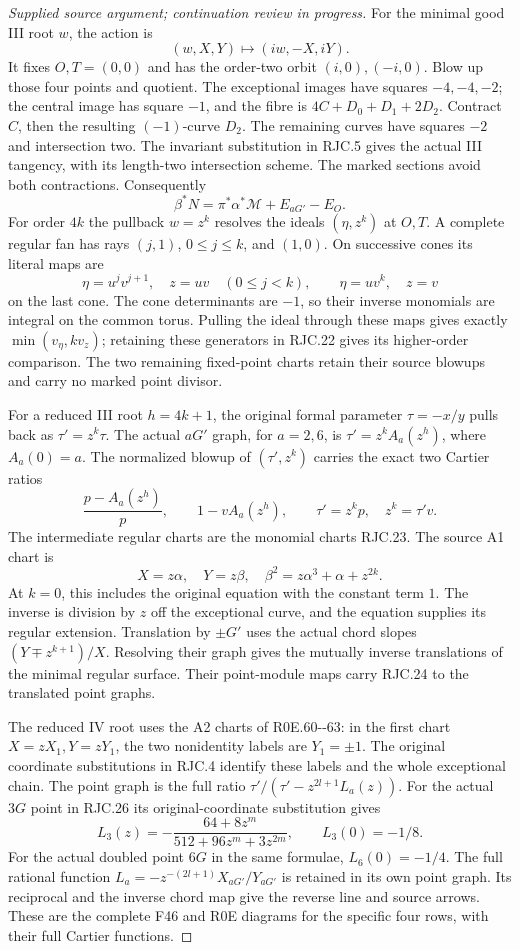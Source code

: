 \begin{proof}[Supplied source argument; continuation review in progress]
For the minimal good III root \(w\), the action is
\[
 (w,X,Y)\longmapsto(iw,-X,iY).
 \tag{RJC.21}
\]
It fixes \(O,T=(0,0)\) and has the order-two orbit
\((i,0),(-i,0)\). Blow up those four points and quotient. The
exceptional images have squares \(-4,-4,-2\); the central image
has square \(-1\), and the fibre is \(4C+D_0+D_1+2D_2\).
Contract \(C\), then the resulting \((-1)\)-curve \(D_2\).
The remaining curves have squares \(-2\) and intersection two.
The invariant substitution in RJC.5 gives the actual III
tangency, with its length-two intersection scheme. The marked
sections avoid both contractions. Consequently
\[
 \beta^*N=\pi^*\alpha^*\mathcal M+E_{aG'}-E_O.
 \tag{RJC.22}
\]
For order \(4k\) the pullback \(w=z^k\) resolves the ideals
\((\eta,z^k)\) at \(O,T\). A complete regular fan has rays
\((j,1)\), \(0\le j\le k\), and \((1,0)\). On successive cones its
literal maps are
\[
 \eta=u^jv^{j+1},\quad z=uv\quad(0\le j<k),\qquad
 \eta=uv^k,\quad z=v
 \tag{RJC.23}
\]
on the last cone. The cone determinants are \(-1\), so their inverse
monomials are integral on the common torus. Pulling the ideal through
these maps gives exactly \(\min(v_\eta,k v_z)\); retaining these
generators in RJC.22 gives its higher-order comparison. The two
remaining fixed-point charts retain their source blowups and carry
no marked point divisor.

For a reduced III root \(h=4k+1\), the original formal parameter
\(\tau=-x/y\) pulls back as \(\tau'=z^k\tau\). The actual
\(aG'\) graph, for \(a=2,6\), is
\(\tau'=z^k A_a(z^h)\), where \(A_a(0)=a\).
The normalized blowup of \((\tau',z^k)\) carries the exact two
Cartier ratios
\[
 \frac{p-A_a(z^h)}p,\qquad 1-vA_a(z^h),\qquad
 \tau'=z^kp,\quad z^k=\tau'v.
 \tag{RJC.24}
\]
The intermediate regular charts are the monomial charts RJC.23.
The source A1 chart is
\[
 X=z\alpha,\quad Y=z\beta,\quad
 \beta^2=z\alpha^3+\alpha+z^{2k}.
 \tag{RJC.25}
\]
At \(k=0\), this includes the original equation with the constant
term \(1\). The inverse is division by \(z\) off the exceptional
curve, and the equation supplies its regular extension. Translation
by \(\pm G'\) uses the actual chord slopes
\((Y\mp z^{k+1})/X\). Resolving their graph gives the mutually
inverse translations of the minimal regular surface. Their
point-module maps carry RJC.24 to the translated point graphs.

The reduced IV root uses the A2 charts of R0E.60-\/-63: in the first
chart \(X=zX_1,Y=zY_1\), the two nonidentity labels are \(Y_1=\pm1\).
The original coordinate substitutions in RJC.4 identify these
labels and the whole exceptional chain. The point graph is the
full ratio \(\tau'/(\tau'-z^{2l+1}L_a(z))\). For the actual
\(3G\) point in RJC.26 its original-coordinate substitution gives
\[
 L_3(z)=-\frac{64+8z^m}{512+96z^m+3z^{2m}},
 \qquad L_3(0)=-1/8.
\]
For the actual doubled point \(6G\) in the same formulae,
\(L_6(0)=-1/4\). The full rational function
\(L_a=-z^{-(2l+1)}X_{aG'}/Y_{aG'}\)
is retained in its own point graph.
Its reciprocal and the inverse chord map give the reverse line
and source arrows. These are the complete F46 and R0E diagrams
for the specific four rows, with their full Cartier functions.


\end{proof}
